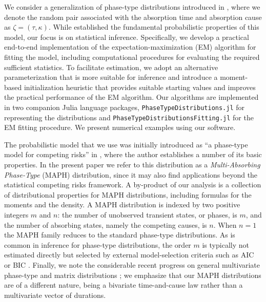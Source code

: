 \documentclass{article}
\newcommand{\aachg}[1]{#1}
\begin{document}
\aachg{We consider a} generalization of phase-type distributions introduced in \citet{lindqvist_phase-type_2022}, where we denote the random pair associated with the absorption time and absorption cause as $\zeta = (\tau, \kappa)$. \aachg{While \citet{lindqvist_phase-type_2022} established the fundamental probabilistic properties of this model, our focus is on statistical inference. Specifically, we develop a practical end-to-end implementation of the expectation-maximization (EM) algorithm for fitting the model, including computational procedures for evaluating the required sufficient statistics. To facilitate estimation, we adopt an alternative parameterization that is more suitable for inference and introduce a moment-based initialization heuristic that provides suitable starting values and improves the practical performance of the EM algorithm.} Our algorithms are implemented in two companion Julia language packages, \texttt{PhaseTypeDistributions.jl} for representing the distributions and \texttt{PhaseTypeDistributionsFitting.jl} for the EM fitting procedure. We present numerical examples using our software.

The probabilistic model that we use was initially introduced as ``a phase-type model for competing risks'' in \citet{lindqvist_phase-type_2022}, where the author establishes a number of its basic properties. In the present paper we refer to this distribution as a {\em Multi-Absorbing Phase-Type} (MAPH) distribution, since it may also find applications beyond the statistical competing risks framework. A by-product of our analysis is a collection of distributional properties for MAPH distributions, including formulas for the moments and the density. A MAPH distribution is indexed by two positive integers $m$ and $n$: the number of unobserved transient states, or phases, is $m$, and the number of absorbing states, namely the competing causes, is $n$. When $n=1$ the MAPH family reduces to the standard phase-type distributions. As is common in inference for phase-type distributions, the order $m$ is typically not estimated directly but selected by external model-selection criteria such as AIC or BIC \citep{bladt_nielsen_2017}. Finally, we note the considerable recent progress on general multivariate phase-type and matrix distributions \citep{albrecher_bladt_yslas_2022, bladt_2023, albrecher_bladt_bladt_2020}; we emphasize that our MAPH distributions are of a different nature, being a bivariate time-and-cause law rather than a multivariate vector of durations.
\end{document}
